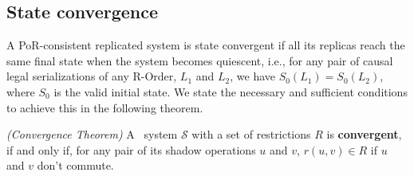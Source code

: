 \subsection{State convergence}
\label{sec:properties:converge}
A PoR-consistent replicated system is state convergent if all its replicas reach
the same final state when the system becomes quiescent, i.e., for any pair of causal legal serializations
of any R-Order, $L_{1}$ and $L_{2}$, we have $S_0(L_1) = S_0(L_2)$, where $S_0$ is the valid initial state. We
state the necessary and sufficient conditions to achieve this in the following theorem.



\begin{theorem}
\label{theorem:convergence}
\emph{(Convergence Theorem)}
A \PRCAJ\ system $\mathscr{S}$ with a set of restrictions $R$ is \textbf{convergent}, if and only if,
for any pair of its shadow operations $u$ and $v$, $r(u, v) \in R$ if $u$ and $v$ don't commute.
\end{theorem}

